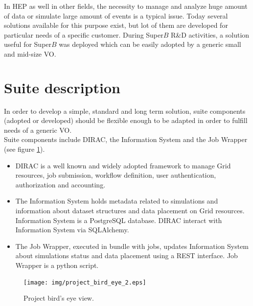 \documentclass[a4paper]{jpconf}
\begin{document}
In HEP as well in other fields, the necessity to manage and analyze huge amount of data or simulate large amount of events is a typical issue.
Today several solutions available for this purpose exist, but lot of them are developed for particular needs of a specific customer.
During Super$B$ R\&D activities, a solution useful for Super$B$ was deployed which can be easily adopted by a generic small and mid-size VO.

\section{Suite description}

In order to develop a simple, standard and long term solution, suite components (adopted or developed) should be flexible enough to be adapted in order to fulfill needs of a generic VO.\\
Suite components include DIRAC\cite{ref:dirac}, the Information System and the Job Wrapper (see figure \ref{fig:project_bird_eye}).\\
\begin{itemize}
\item DIRAC is a well known and widely adopted framework to manage Grid resources, job submission, workflow definition, user authentication, authorization and accounting.
\item The Information System holds metadata related to simulations and information about dataset structures and data placement on Grid resources. Information System is a PostgreSQL\cite{ref:postgres} database. DIRAC interact with Information System via SQLAlchemy\cite{ref:sqlalchemy}.
\item The Job Wrapper, executed in bundle with jobs, updates Information System about simulations status and data placement using a REST interface. Job Wrapper is a python script.
\end{itemize}

\begin{figure}[h]
\texttt{[image: img/project\_bird\_eye\_2.eps]}\hspace{2pc}%
\caption{\label{fig:project_bird_eye}Project bird's eye view.}
\end{figure}

 
\end{document}
